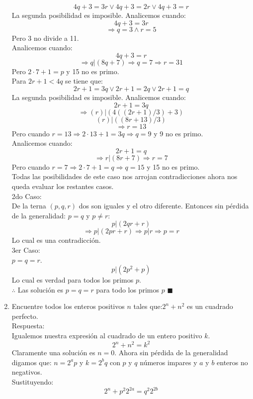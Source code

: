\documentclass{book}
\begin{document}
\begin{enumerate}
        $$4q + 3=3r   \vee   4q + 3=2r   \vee   4q + 3=r$$
        La segunda posibilidad es imposible. Analicemos cuando:
        $$4q + 3=3r$$
        $$\Rightarrow q=3 \wedge r=5$$
        Pero 3 no divide a 11.\\
        Analicemos cuando:
        $$4q + 3=r $$
        $$\Rightarrow q|(8q + 7) \Rightarrow q=7\Rightarrow r=31$$
        Pero  $2\cdot 7 + 1=p$ y 15 no es primo.\\
        Para $2r + 1<4q$   se tiene que:
        $$2r + 1=3q   \vee   2r + 1=2q   \vee   2r + 1=q$$
        La segunda posibilidad es imposible. Analicemos cuando:
        $$2r + 1=3q$$
        $$\Rightarrow ( r)|(4((2r + 1)/3) + 3)$$
        $$( r)|((8r+13)/3)$$
        $$\Rightarrow r=13$$
        Pero cuando $r=13\Rightarrow 2\cdot13 + 1=3q\Rightarrow q=9$ y 9 no es primo.\\
        Analicemos cuando:
        $$2r + 1=q$$
        $$\Rightarrow r|(8r + 7) \Rightarrow r=7$$
        Pero cuando $r=7\Rightarrow 2\cdot7 + 1=q\Rightarrow q=15$ y 15 no es primo.\\
        Todas las posibilidades de este caso nos arrojan contradicciones ahora nos queda evaluar los restantes casos.\\
        2do Caso: \\
        De la terna $(p,q,r)$  dos son iguales y el otro diferente. Entonces sin pérdida de la generalidad: $p=q$ y $p\neq r$:
        $$p|(2qr + r)$$
        $$\Rightarrow p|(2pr + r)  \Rightarrow  p|r\Rightarrow p=r$$
        Lo cual es una contradicción.\\
        3er Caso:\\
        $p=q=r$.\\
        $$p|(2p^2 + p)$$
        Lo cual es verdad para todos los primos $p$.\\
        $\therefore$ Las solución es $p=q=r$ para todo los primos $p$ $\blacksquare$\\
        \item Encuentre todos los enteros positivos $n$ tales que:$2^n+n^2$ es un cuadrado perfecto.\\
        Respuesta:\\
        Igualemos nuestra expresión al cuadrado de un entero positivo $k$.
        $$2^n+n^2=k^2$$
        Claramente una solución es $n=0$.
        Ahora sin pérdida de la generalidad digamos que: $n=2^a p$ y $k=2^b q$ con $p$ y $q$ números impares y $a$ y $b$ enteros no negativos.\\
        Sustituyendo:
        $$2^n+p^2 2^{2a}=q^2 2^{2b}$$

\end{enumerate}
\end{document}

